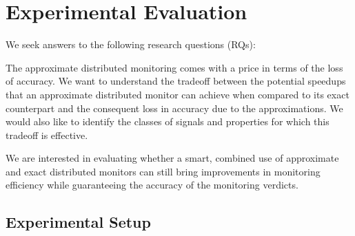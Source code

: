 \section{Experimental Evaluation} 
\label{sec:experiments}



We seek answers to the following research questions (RQs):
\begin{resq}
The approximate distributed monitoring comes with a price in terms of the loss of accuracy.
We want to understand the tradeoff between the potential speedups that an approximate distributed monitor can achieve when compared to its exact counterpart and the consequent loss in accuracy due to the approximations.
We would also like to identify the classes of signals and properties for which this tradeoff is effective. 
\end{resq}
\begin{resq}
We are interested in evaluating whether a smart, combined use of approximate and exact distributed monitors can still bring improvements in monitoring efficiency while guaranteeing the accuracy of the monitoring verdicts. 
\end{resq}


\subsection{Experimental Setup}

